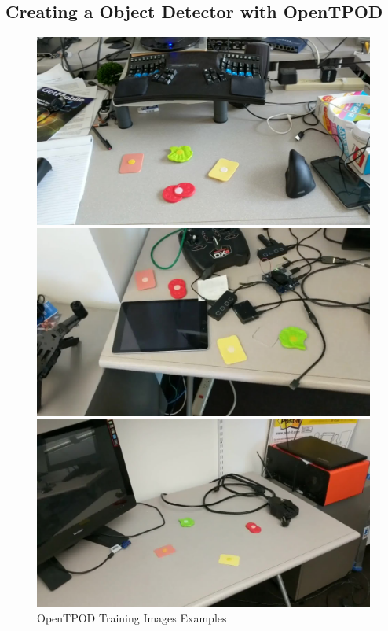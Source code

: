 \subsection{Creating a Object Detector with OpenTPOD}

\begin{figure}[]
  \centering
  \begin{minipage}[b]{0.32\textwidth}
    \includegraphics[width=\textwidth]{FIGS/sandwich-training-1.jpg}
  \end{minipage}
  \begin{minipage}[b]{0.32\textwidth}
    \includegraphics[width=\textwidth]{FIGS/sandwich-training-2.jpg}
  \end{minipage}
  \begin{minipage}[b]{0.32\textwidth}
    \includegraphics[width=\textwidth]{FIGS/sandwich-training-3.jpg}
  \end{minipage}
    \caption{OpenTPOD Training Images Examples}
  \label{figs:tpod-example-training-images}
\end{figure}

